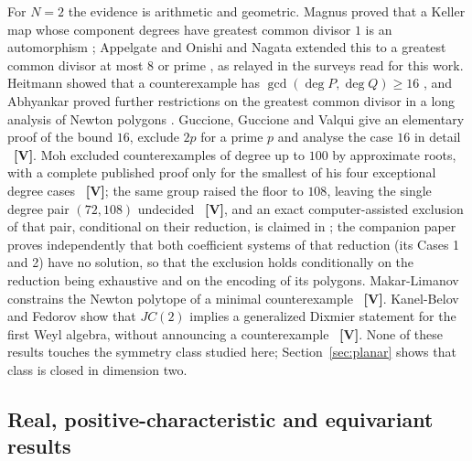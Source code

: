 \documentclass[11pt]{article}
\theoremstyle{definition}
\theoremstyle{remark}
\newcommand{\VV}{\textbf{[V]}}
\begin{document}
For $N = 2$ the evidence is arithmetic and geometric. Magnus proved that a Keller map whose component degrees have greatest common
divisor $1$ is an automorphism \cite{Magnus1955}; Appelgate and Onishi and Nagata extended this to a greatest common divisor at most
$8$ or prime \cite{AppelgateOnishi1985, Nagata1989}, as relayed in the surveys read for this work. Heitmann showed that a counterexample has
$\gcd(\deg P, \deg Q) \ge 16$ \cite{Heitmann1990}, and Abhyankar proved further restrictions on the greatest common divisor in a long
analysis of Newton polygons \cite{Abhyankar2008}. Guccione, Guccione and Valqui give an elementary proof of the bound $16$, exclude
$2p$ for a prime $p$ and analyse the case $16$ in detail \cite{GGV2017}~\VV{}. Moh excluded counterexamples of degree up to $100$ by
approximate roots, with a complete published proof only for the smallest of his four exceptional degree cases \cite{Moh1983}~\VV{}; the
same group raised the floor to $108$, leaving the single degree pair $(72,108)$ undecided \cite{GGHV2017, GGHV2022}~\VV{}, and an exact
computer-assisted exclusion of that pair, conditional on their reduction, is claimed in \cite{Helali2026}; the companion paper \cite{SLplanar} proves independently that both coefficient systems of that reduction (its Cases 1 and 2) have no solution, so that the exclusion holds conditionally on the reduction being exhaustive and on the encoding of its polygons. Makar-Limanov constrains the
Newton polytope of a minimal counterexample \cite{MakarLimanov2021}~\VV{}. Kanel-Belov and Fedorov show that $JC(2)$ implies a generalized
Dixmier statement for the first Weyl algebra, without announcing a counterexample \cite{KanelBelovFedorov2026}~\VV{}. None of these
results touches the symmetry class studied here; Section~\ref{sec:planar} shows that class is closed in dimension two.

\subsection{Real, positive-characteristic and equivariant results}
\end{document}
